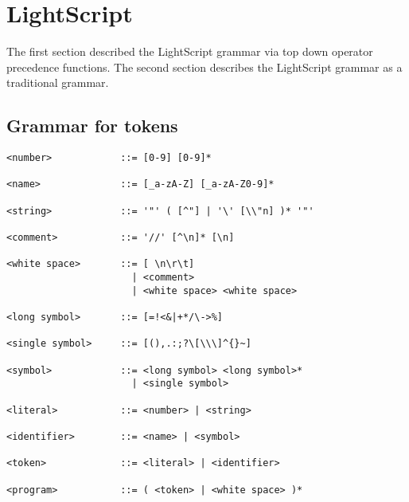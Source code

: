 \section{LightScript}
The first section described the LightScript grammar via top down operator precedence functions.
The second section describes the LightScript grammar as a traditional grammar.

\subsection{Grammar for tokens}
\begin{verbatim}
<number>            ::= [0-9] [0-9]*

<name>              ::= [_a-zA-Z] [_a-zA-Z0-9]*

<string>            ::= '"' ( [^"] | '\' [\\"n] )* '"'

<comment>           ::= '//' [^\n]* [\n]

<white space>       ::= [ \n\r\t] 
                      | <comment>
                      | <white space> <white space>

<long symbol>       ::= [=!<&|+*/\->%]

<single symbol>     ::= [(),.:;?\[\\\]^{}~]

<symbol>            ::= <long symbol> <long symbol>*
                      | <single symbol>

<literal>           ::= <number> | <string>

<identifier>        ::= <name> | <symbol>

<token>             ::= <literal> | <identifier>

<program>           ::= ( <token> | <white space> )*
\end{verbatim}

